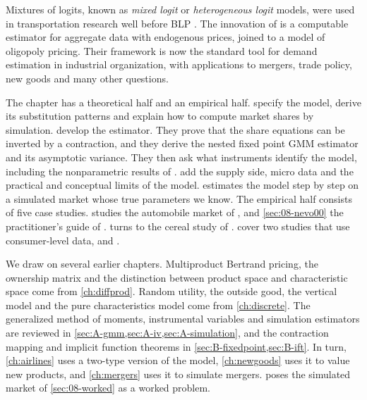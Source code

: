 Mixtures of logits, known as \emph{mixed logit} or \emph{heterogeneous logit} models, were used in
transportation research well before BLP \citep{BoydMellman1980,CardellDunbar1980}. The innovation of
\citet{BerryLevinsohnPakes1995} is a computable estimator for aggregate data with endogenous prices, joined to a
model of oligopoly pricing. Their framework is now the standard tool for demand estimation in industrial
organization, with applications to mergers, trade policy, new goods and many other questions.

The chapter has a theoretical half and an empirical half. 
specify the model, derive its substitution patterns and explain how to compute market shares by simulation.
 develop the estimator. They prove that the share equations
can be inverted by a contraction, and they derive the nested fixed point GMM estimator and its asymptotic variance.
They then ask what instruments identify the model, including the nonparametric results of \citet{BerryHaile2014}.
 add the supply side, micro data and the practical and
conceptual limits of the model.  estimates the model step by step on a simulated market whose
true parameters we know. The empirical half consists of five case studies.  studies the
automobile market of \citet{BerryLevinsohnPakes1995}, and \cref{sec:08-nevo00} the practitioner's guide of
\citet{Nevo2000a}.  turns to the cereal study of \citet{Nevo2001}.  cover two studies that use consumer-level data, \citet{BerryLevinsohnPakes2004} and
\citet{Goldberg1995}.

We draw on several earlier chapters. Multiproduct Bertrand pricing, the ownership matrix and the distinction
between product space and characteristic space come from \cref{ch:diffprod}. Random utility, the outside good,
the vertical model and the pure characteristics model come from \cref{ch:discrete}. The generalized method of
moments, instrumental variables and simulation estimators are reviewed in
\cref{sec:A-gmm,sec:A-iv,sec:A-simulation}, and the contraction mapping and implicit function theorems in
\cref{sec:B-fixedpoint,sec:B-ift}. In turn, \cref{ch:airlines} uses a two-type
version of the model, \cref{ch:newgoods} uses it to value new products, and \cref{ch:mergers} uses it to simulate
mergers.  poses the simulated market of \cref{sec:08-worked} as a worked problem.


